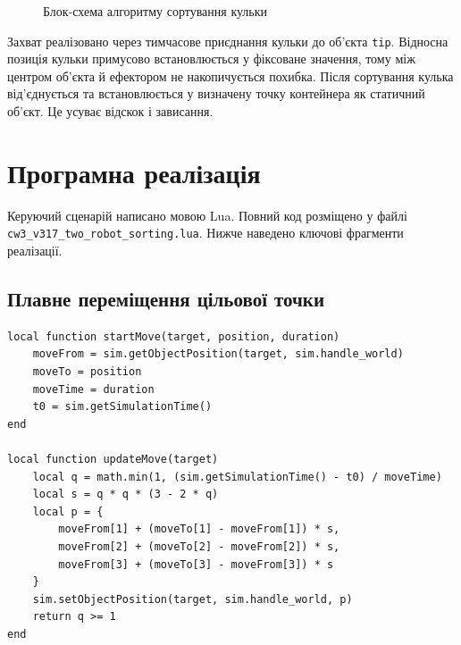 \documentclass[12pt,a4paper]{article}
\begin{document}
\begin{figure}[H]
  \caption{Блок-схема алгоритму сортування кульки}
  \label{fig:sorting-algorithm}
\end{figure}

Захват реалізовано через тимчасове приєднання кульки до об'єкта
\texttt{tip}. Відносна позиція кульки примусово встановлюється у фіксоване
значення, тому між центром об'єкта й ефектором не накопичується похибка.
Після сортування кулька від'єднується та встановлюється у визначену точку
контейнера як статичний об'єкт. Це усуває відскок і зависання.

\section{Програмна реалізація}

Керуючий сценарій написано мовою Lua. Повний код розміщено у файлі
\nolinkurl{cw3_v317_two_robot_sorting.lua}. Нижче наведено ключові
фрагменти реалізації.

\subsection{Плавне переміщення цільової точки}

\begin{listing}[H]
\begin{verbatim}
local function startMove(target, position, duration)
    moveFrom = sim.getObjectPosition(target, sim.handle_world)
    moveTo = position
    moveTime = duration
    t0 = sim.getSimulationTime()
end

local function updateMove(target)
    local q = math.min(1, (sim.getSimulationTime() - t0) / moveTime)
    local s = q * q * (3 - 2 * q)
    local p = {
        moveFrom[1] + (moveTo[1] - moveFrom[1]) * s,
        moveFrom[2] + (moveTo[2] - moveFrom[2]) * s,
        moveFrom[3] + (moveTo[3] - moveFrom[3]) * s
    }
    sim.setObjectPosition(target, sim.handle_world, p)
    return q >= 1
end
\end{verbatim}
\caption{Інтерполяція положення ефектора}
\end{listing}
\end{document}
